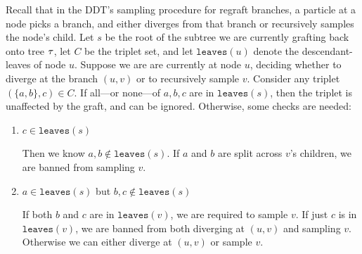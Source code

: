 Recall that in the DDT's sampling procedure for regraft branches,
a particle at a node picks a branch, and either diverges from that
branch or recursively samples the node's child.
Let $s$ be the root of the subtree we are currently grafting 
back onto tree $\tau$, let $C$ be the
triplet set, and let $\texttt{leaves}(u)$
denote the descendant-leaves of node $u$.
Suppose we are are currently at node $u$,
deciding whether to diverge
at the branch $(u, v)$ or to recursively sample $v$.
Consider any triplet $(\{a, b\}, c) \in C$. If all---or none---of $a,b,c$ are in $\texttt{leaves}(s)$, then the triplet is 
unaffected by the graft, and can be ignored. Otherwise, 
some checks are needed:
\begin{enumerate}
\item $c \in \texttt{leaves}(s)$

Then we know $a,b \not\in \texttt{leaves}(s)$. If $a$ and $b$ are split across $v$'s children,
we are banned from sampling $v$.

\item $a \in \texttt{leaves}(s)$ but $b,c \not\in \texttt{leaves}(s)$

If both $b$ and $c$ are in $\texttt{leaves}(v)$, we are
required to sample $v$.
If just $c$ is in $\texttt{leaves}(v)$, we are banned
from both diverging at $(u, v)$ and sampling $v$.
Otherwise we can either diverge at $(u, v)$ or sample $v$.

\end{enumerate}

